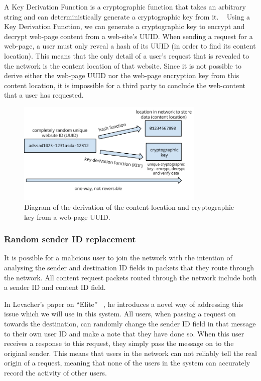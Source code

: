 A Key Derivation Function is a cryptographic function that takes an arbitrary string and can
deterministically generate a cryptographic key from it. ~\cite{kdf} Using a Key Derivation Function, we
can generate a cryptographic key to encrypt and decrypt web-page content from a web-site's UUID.
When sending a request for a web-page, a user must only reveal a hash of its UUID (in order to
find its content location). This means that the only detail of a user's request that is revealed to the network
is the content location of that website. Since it is not possible to derive either the web-page UUID nor the web-page
encryption key from this content location, it is impossible for a third party to conclude the web-content that a user
has requested.

\begin{figure}[H]
    \centering
    \includegraphics[width=0.8\textwidth]{img/KDF-hashing-example.png}
    \caption{Diagram of the derivation of the content-location and cryptographic key from a web-page UUID.}
    \label{fig:kdf_hashing}
\end{figure}


\subsubsection{Random sender ID replacement}


It is possible for a malicious user to join the network with the intention of analysing the
sender and destination ID fields in packets that they route through the network. All content request
packets routed through the network include both a sender ID and content ID field.

In Levacher's paper on “Elite” ~\cite{levacher}, he introduces a novel way of addressing this issue which we will use in this system.
All users, when passing a request on towards the destination, can randomly change the sender ID field in that message
to their own user ID and make a note that they have done so. When this user receives a response to this request,
they simply pass the message on to the original sender. This means that users in the network can not reliably tell
the real origin of a request, meaning that none of the users in the system can accurately record the activity of other users.

